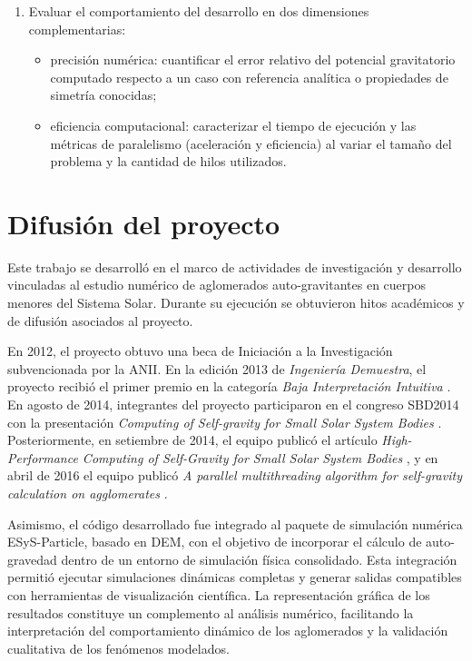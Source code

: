 \documentclass[a4paper,11pt]{book}
\begin{document}
\begin{enumerate}
	\item Evaluar el comportamiento del desarrollo en dos dimensiones complementarias:
	      \begin{itemize}
		      \item precisión numérica: cuantificar el error relativo del potencial gravitatorio computado respecto a un caso con referencia analítica o propiedades de simetría conocidas;
		      \item eficiencia computacional: caracterizar el tiempo de ejecución y las métricas de paralelismo (aceleración y eficiencia) al variar el tamaño del problema y la cantidad de hilos utilizados.
	      \end{itemize}
\end{enumerate}

\section{Difusión del proyecto}

Este trabajo se desarrolló en el marco de actividades de investigación y desarrollo vinculadas al estudio numérico de aglomerados auto-gravitantes en cuerpos menores del Sistema Solar. Durante su ejecución se obtuvieron hitos académicos y de difusión asociados al proyecto.

En 2012, el proyecto obtuvo una beca de Iniciación a la Investigación subvencionada por la ANII. En la edición 2013 de \textit{Ingeniería Demuestra}, el proyecto recibió el primer premio en la categoría \textit{Baja Interpretación Intuitiva} \cite{1}. En agosto de 2014, integrantes del proyecto participaron en el congreso SBD2014 con la presentación \textit{Computing of Self-gravity for Small Solar System Bodies} \cite{2}. Posteriormente, en setiembre de 2014, el equipo publicó el artículo \textit{High-Performance Computing of Self-Gravity for Small Solar System Bodies} \cite{3}, y en abril de 2016 el equipo publicó \textit{A parallel multithreading algorithm for self-gravity calculation on agglomerates} \cite{4}.

Asimismo, el código desarrollado fue integrado al paquete de simulación numérica ESyS-Particle, basado en DEM, con el objetivo de incorporar el cálculo de auto-gravedad dentro de un entorno de simulación física consolidado. Esta integración permitió ejecutar simulaciones dinámicas completas y generar salidas compatibles con herramientas de visualización científica. La representación gráfica de los resultados constituye un complemento al análisis numérico, facilitando la interpretación del comportamiento dinámico de los aglomerados y la validación cualitativa de los fenómenos modelados.
\end{document}
